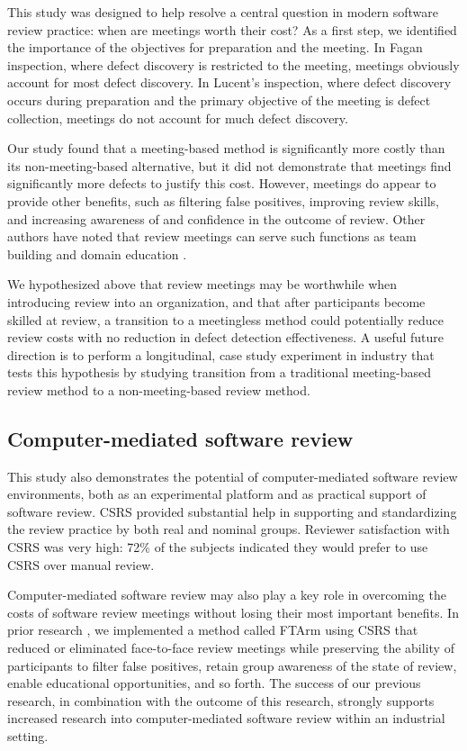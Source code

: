 This study was designed to help resolve a central question in modern
software review practice: when are meetings worth their cost?  As a first step,
we identified the importance of the objectives for preparation and the
meeting. In Fagan inspection, where defect discovery is restricted to the
meeting, meetings obviously account for most defect discovery. In 
Lucent's inspection, where defect discovery occurs during preparation and the
primary objective of the meeting is defect collection, meetings do not
account for much defect discovery.

Our study found that a meeting-based method is significantly more costly
than its non-meeting-based alternative, but it did not demonstrate that
meetings find significantly more defects to justify this cost. However,
meetings do appear to provide other benefits, such as filtering false
positives, improving review skills, and increasing awareness of
and confidence in the outcome of review.  Other authors have noted that
review meetings can serve such functions as team building and domain
education \cite{Freedman90}.

We hypothesized above that review meetings may be worthwhile when
introducing review into an organization, and that after participants become
skilled at review, a transition to a meetingless method could potentially
reduce review costs with no reduction in defect detection effectiveness.  A
useful future direction is to perform a longitudinal, case study experiment
in industry that tests this hypothesis by studying transition from a
traditional meeting-based review method to a non-meeting-based review
method.

\subsection{Computer-mediated software review}

This study also demonstrates the potential of computer-mediated software
review environments, both as an experimental platform and as practical
support of software review. CSRS provided substantial help in 
supporting and standardizing the review practice by both real and nominal
groups.  Reviewer satisfaction with CSRS was very high: 72\% of the 
subjects indicated they would prefer to use CSRS over manual review.

Computer-mediated software review may also play a key role in overcoming
the costs of software review meetings without losing their most important
benefits. In prior research \cite{Johnson94}, we implemented a method
called FTArm using CSRS that reduced or eliminated 
face-to-face review meetings while preserving the ability of participants
to filter false positives, retain group awareness of the state of review,
enable educational opportunities, and so forth.  The success of our
previous research, in combination with the outcome of this research,
strongly supports increased research into computer-mediated
software review within an industrial setting. 


